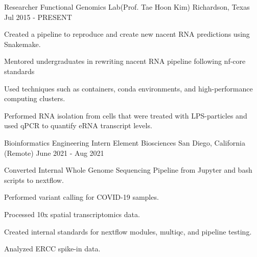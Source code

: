 

\begin{cventries}

	\cventry
	{Researcher} %
	{Functional Genomics Lab(Prof. Tae Hoon Kim)} %
	{Richardson, Texas} %
	{Jul 2015 - PRESENT} %
	{
		\begin{cvitems} %
			\item {Created a pipeline to reproduce and create new nacent RNA
			            predictions using Snakemake.}
			\item {Mentored undergraduates in rewriting nacent RNA pipeline following nf-core standards}
			\item {Used techniques such as containers, conda environments, and
			            high-performance computing clusters.}
			\item {Performed RNA isolation from cells that were treated with LPS-particles and used qPCR to quantify eRNA transcript levels.}
		\end{cvitems}
	}


	\cventry
	{Bioinformatics Engineering Intern} %
	{Element Biosciences} %
	{San Diego, California (Remote)} %
	{June 2021 - Aug 2021} %
	{
		\begin{cvitems} %
			\item {Converted Internal Whole Genome Sequencing Pipeline from Jupyter and bash scripts to nextflow.}
			\item {Performed variant calling for COVID-19 samples.}
			\item {Processed 10x spatial transcriptomics data.}
			\item {Created internal standards for nextflow modules, multiqc, and pipeline testing.}
			\item {Analyzed ERCC spike-in data.}
		\end{cvitems}
	}


\end{cventries}
